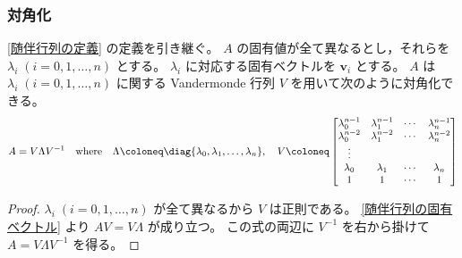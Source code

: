             \subsubsection{対角化}
                \begin{shadebox}
                    \ref{随伴行列の定義} の定義を引き継ぐ。
                    $A$ の固有値が全て異なるとし，それらを $\lambda_i\;(i=0,1,\dots,n)$ とする。
                    $\lambda_i$ に対応する固有ベクトルを $\bm{v}_i$ とする。
                    $A$ は $\lambda_i\;(i=0,1,\dots,n)$ に関する Vandermonde 行列 $V$ を用いて次のように対角化できる。
                    \[
                        A = V\Lambda V^{-1}\quad\text{where}\quad\Lambda\coloneq\diag{\lambda_0,\lambda_1,\dots,\lambda_n},\quad V\coloneq\begin{bmatrix}
                            \lambda_0^{n-1} & \lambda_1^{n-1} & \cdots & \lambda_n^{n-1} \\
                            \lambda_0^{n-2} & \lambda_1^{n-2} & \cdots & \lambda_n^{n-2} \\
                            \vdots \\
                            \lambda_0 & \lambda_1 & \cdots & \lambda_n \\
                            1 & 1 & \cdots & 1
                        \end{bmatrix}
                    \]
                \end{shadebox}
                \begin{proof}
                    \quad\par
                    $\lambda_i\;(i=0,1,\dots,n)$ が全て異なるから $V$ は正則である。
                    \ref{随伴行列の固有ベクトル} より $AV = V\Lambda$ が成り立つ。
                    この式の両辺に $V^{-1}$ を右から掛けて $A = V\Lambda V^{-1}$ を得る。
                \end{proof}
